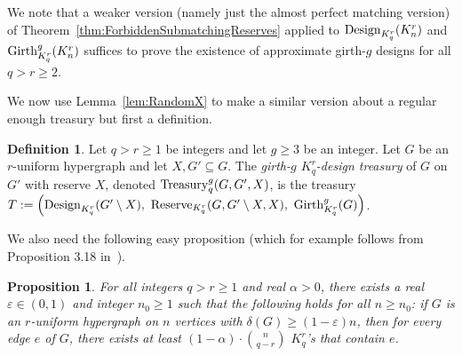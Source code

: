 \documentclass[11pt]{article}
\newcounter{i}
\theoremstyle{plain}
\newtheorem{proposition}[thm]{Proposition}
\theoremstyle{plain} %
\theoremstyle{definition}
\newtheorem{definition}[thm]{Definition}
\begin{document}
We note that a weaker version (namely just the almost perfect matching version) of Theorem~\ref{thm:ForbiddenSubmatchingReserves} applied to ${\rm Design}_{K_q^r}(K_n^r)$ and ${\rm Girth}_{K_q^r}^g(K_n^r)$ suffices to prove the existence of approximate girth-$g$ designs for all $q > r\ge 2$. 

We now use Lemma~\ref{lem:RandomX} to make a similar version about a regular enough treasury but first a definition.

\begin{definition}\label{def:GirthTreasury}
Let $q > r \ge 1$ be integers and let $g\ge 3$ be an integer. Let $G$ be an $r$-uniform hypergraph and let $X,G'\subseteq G$. The \emph{girth-$g$ $K_q^r$-design treasury} of $G$ on $G'$ with reserve $X$, denoted ${\rm Treasury}_q^g(G,G',X)$, is the treasury $T:=\left({\rm Design}_{K_q^r}(G'\setminus X),~{\rm Reserve}_{K_q^r}(G, G'\setminus X, X),~{\rm Girth}_{K_q^r}^g(G)\right)$.
\end{definition}

We also need the following easy proposition (which for example follows from Proposition 3.18 in~\cite{DPI}).

\begin{proposition}\label{prop:Turan}
For all integers $q > r\ge 1$ and real $\alpha > 0$, there exists a real $\varepsilon\in (0,1)$ and integer $n_0\ge 1$ such that the following holds for all $n\ge n_0$: if $G$ is an $r$-uniform hypergraph on $n$ vertices with $\delta(G)\ge (1-\varepsilon)n$, then for every edge $e$ of $G$, there exists at least $(1-\alpha)\cdot \binom{n}{q-r}$ $K_q^r$'s that contain $e$.
\end{proposition}
\end{document}
